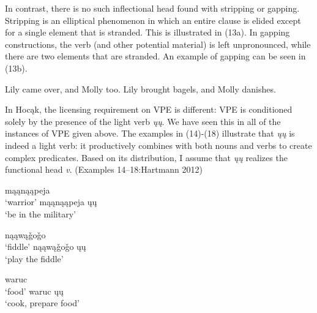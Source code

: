 \documentclass[output=paper]{LSP/langsci}
\begin{document}
In contrast, there is no such inflectional head found with stripping or gapping. Stripping is an elliptical phenomenon in which an entire clause is elided except for a single element that is stranded. This is illustrated in (13a). In gapping constructions, the verb (and other potential material) is left unpronounced, while there are two elements that are stranded. An example of gapping can be seen in (13b).

\begin{exe}
\ex
\begin{xlist}
\ex
Lily came over, and Molly too.
\ex
Lily brought bagels, and Molly danishes.
\end{xlist}
\end{exe}

In Hoc\k{a}k, the licensing requirement on VPE is different: VPE is conditioned solely by the presence of the light verb \emph{\k{u}\k{u}}. We have seen this in all of the instances of VPE given above. The examples in (14)-(18) illustrate that \emph{\k{u}\k{u}} is indeed a light verb: it productively combines with both nouns and verbs to create complex predicates. Based on its distribution, I assume that \emph{\k{u}\k{u}} realizes the functional head \emph{v}. (Examples 14--18:Hartmann 2012)

\begin{exe}
\ex
\begin{multicols}{2}
\begin{xlist}
\ex
m\k{a}\k{a}n\k{a}\k{a}peja\\
`warrior'
\ex
m\k{a}\k{a}n\k{a}\k{a}peja \k{u}\k{u}\\
`be in the military'
\end{xlist}
\end{multicols}
\end{exe}

\begin{exe}
\ex
\begin{multicols}{2}
\begin{xlist}
\ex
n\k{a}\k{a}w\k{a}\v{g}o\v{g}o\\
`fiddle'
\ex
n\k{a}\k{a}w\k{a}\v{g}o\v{g}o \k{u}\k{u}\\
`play the fiddle'
\end{xlist}
\end{multicols}
\end{exe}

\begin{exe}
\ex
\begin{multicols}{2}
\begin{xlist}
\ex
waruc\\
`food'
\ex
waruc \k{u}\k{u}\\
`cook, prepare food'
\end{xlist}
\end{multicols}
\end{exe}
\end{document}
